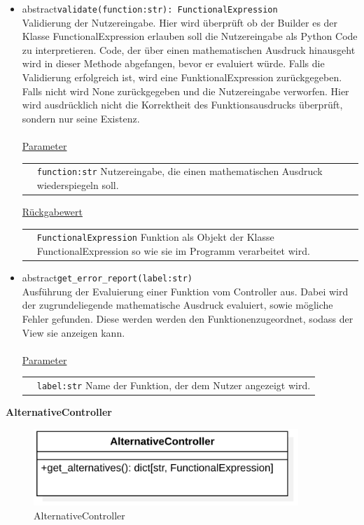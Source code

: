\documentclass{article}
\begin{document}
\begin{itemize}
\item \flqq{}abstract\frqq \texttt{validate(function:str): FunctionalExpression}\\ Validierung der Nutzereingabe. Hier wird überprüft ob der Builder es der Klasse FunctionalExpression erlauben soll die Nutzereingabe als Python Code zu interpretieren. Code, der über einen mathematischen Ausdruck hinausgeht wird in dieser Methode abgefangen, bevor er evaluiert würde. Falls die Validierung erfolgreich ist, wird eine FunktionalExpression zurückgegeben. Falls nicht wird None zurückgegeben und die Nutzereingabe verworfen. Hier wird ausdrücklich nicht die Korrektheit des Funktionsausdrucks überprüft, sondern nur seine Existenz.\\\\
\underline{{Parameter}}\\
\begin{tabular}{lp{10.7cm}}
 & \texttt{function:str}  Nutzereingabe, die einen mathematischen Ausdruck wiederspiegeln soll. \\
\end{tabular}
\newline\newline
\underline{{Rückgabewert}}\\
\begin{tabular}{lp{10.7cm}}
 & \texttt{FunctionalExpression} Funktion als Objekt der Klasse FunctionalExpression so wie sie im Programm verarbeitet wird. \\
\end{tabular}


\item \flqq{}abstract\frqq \texttt{get\_error\_report(label:str)}\\ Ausführung der Evaluierung einer Funktion vom Controller aus. Dabei wird der zugrundeliegende mathematische Ausdruck evaluiert, sowie mögliche Fehler gefunden. Diese werden werden den Funktionenzugeordnet, sodass der View sie anzeigen kann. \\\\
\underline{{Parameter}}\\
\begin{tabular}{lp{10.7cm}}
 & \texttt{label:str} Name der Funktion, der dem Nutzer angezeigt wird. \\
\end{tabular}
\end{itemize}


\newpage
\textbf{\large{AlternativeController}}
\begin{figure}[H]%
    \centering
    \includegraphics[width=10cm]{entwurf/Floriane/AlternativeController.png}
    \caption{AlternativeController}
\end{figure}
\end{document}
